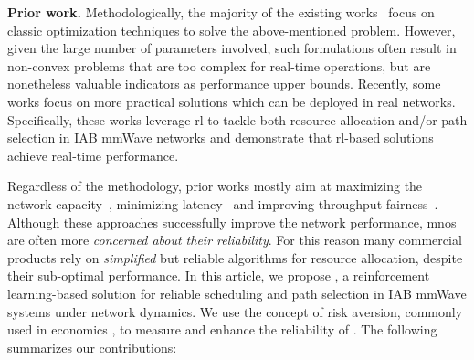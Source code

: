\textbf{Prior work.} Methodologically, the majority of the existing works~\cite{pan2017joint, alizadeh2019load, huang2015joint, nguyen2020nonsmooth, rasekh2015interference, kwon2019joint, pizzo2017optimal, kulkarni2018max,9839601} focus on classic optimization techniques to solve the above-mentioned problem. However, given the large number of parameters involved, such formulations often result in non-convex problems that are too complex for real-time operations, but are nonetheless valuable indicators as performance upper bounds. Recently, some works focus on more practical solutions which can be deployed in real networks\cite{lei2020deep, ZHANG2021108248, 9473755}. Specifically, these works leverage \gls{rl} to tackle both resource allocation and/or path selection in IAB mmWave networks and demonstrate that \gls{rl}-based solutions achieve real-time performance. 

Regardless of the methodology,  prior works mostly aim at maximizing the network capacity~\cite{pan2017joint, alizadeh2019load, huang2015joint, nguyen2020nonsmooth, rasekh2015interference, kwon2019joint, pizzo2017optimal, kulkarni2018max}, minimizing latency~\cite{vu2018path, ortiz2019scaros} and improving throughput fairness~\cite{alizadeh2019load, pagin2022}. Although these approaches successfully improve the network performance, \glspl{mno} are often more \textit{concerned about their reliability}. 
For this reason many commercial products rely on \textit{simplified} but reliable algorithms for resource allocation, despite their sub-optimal performance. 
In this article, we propose \name{}, a reinforcement learning-based solution for reliable scheduling and path selection in IAB mmWave systems under network dynamics. We use the concept of risk aversion, commonly used in economics \cite{Rockafellar2000, Levy1998}, to measure and enhance the reliability of \name{}. The following summarizes our contributions: 

